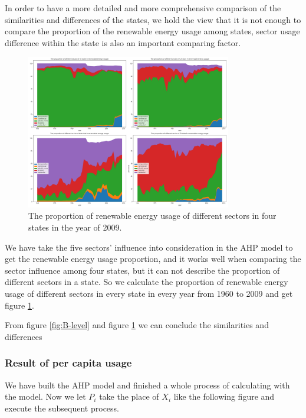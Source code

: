 \documentclass[a4paper,11pt]{article}
\begin{document}
\par In order to have a more detailed and more comprehensive comparison of the similarities and differences of the states, we hold the view that it is not  enough to compare the proportion of the renewable energy usage among states, sector usage difference within the state is also an important comparing factor.

\begin{figure}[h]%
    \centering 
    \includegraphics[width=0.8\textwidth]{./Pic/B-percent.png}
    \caption{The proportion of renewable energy usage of different sectors in four states in the year of 2009.}
    \label{fig:B-percent}  
\end{figure}

\par We have take the five sectors' influence into consideration in the AHP model to get the renewable energy usage proportion, and it works well when comparing the sector influence among four states, but it can not describe the proportion of different sectors in a state. So we calculate the proportion of renewable energy usage of different sectors in every state in every year from 1960 to 2009 and get figure \ref{fig:B-percent}.
\par From figure \ref{fig:B-level} and figure \ref{fig:B-percent} we can conclude the similarities and differences


\subsubsection{Result of per capita usage}
\par We have built the AHP model and finished a whole process of calculating with the model. Now we let $P_i$ take the place of $X_i$ like the following figure and execute the subsequent process.
\end{document}
